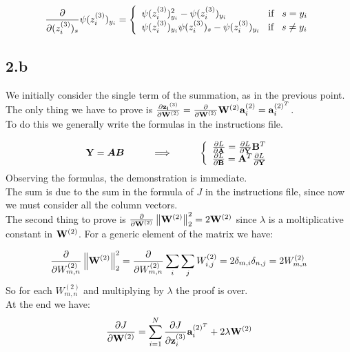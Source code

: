 \documentclass{article}
\DeclareRobustCommand{\vect}[1]{
  \ifcat#1\relax
    \boldsymbol{#1}
  \else
    \mathbf{#1}
  \fi}
\begin{document}
$$
\frac{\partial }{\partial (z_i^{(3)})_s} \psi(z_i^{(3)})_{y_i} = \left\{\begin{array}{l} \psi(z_i^{(3)})_{y_i}^2 - \psi(z_i^{(3)})_{y_i} \hskip 1.53cm \text{if}\hskip 0.3cm  s = y_i\\ \psi(z_i^{(3)})_{y_i}\psi(z_i^{(3)})_{s} - \psi(z_i^{(3)})_{y_i} \hskip 0.3cm \text{if}\hskip 0.3cm  s \neq y_i\end{array}\right.
$$


\subsection*{2.b}
We initially consider the single term of the summation, as in the previous point. The only thing we have to prove is $\frac{\partial \vect{z_i}^{(3)}}{\partial \vect{W}^{(2)}} = \frac{\partial}{\partial \vect{W}^{(2)}}  \vect{W}^{(2)}\vect{a}_i^{(2)} = \vect{a}_i^{(2)^T}$. \\
To do this we generally write the formulas in the instructions file.

$$
\vect{Y} = \vect{AB} \hskip 1cm \Longrightarrow \hskip 1cm \left\{\begin{array}{l} 
\frac{\partial L}{\partial \vect{A}} = \frac{\partial L}{\partial \vect{Y}}\vect{B}^T\\ \frac{\partial L}{\partial \vect{B}} = \vect{A}^T\frac{\partial L}{\partial \vect{Y}}
\end{array}\right.
$$
Observing the formulas, the demonstration is immediate.\\
The sum is due to the sum in the formula of $ J $ in the instructions file, since now we must consider all the column vectors.\\

The second thing to prove is $\frac{\partial }{\partial \vect{W}^{(2)}} \left \| \vect{W}^{(2)} \right \|^2_2 = 2 \vect{W}^{(2)}$ since $\lambda$ is a moltiplicative constant in $\vect{W}^{(2)}$.
For a generic element of the matrix we have: 

$$
\frac{\partial }{\partial W^{(2)}_{m,n}} \left \| \vect{W}^{(2)} \right \|^2_2 = \frac{\partial }{\partial W^{(2)}_{m,n}} \sum_{i}\sum_{j} W^{(2)}_{i,j} = 2\delta_{m,i}\delta_{n,j} = 2 W^{(2)}_{m,n}
$$
So for each $W^{(2)}_{m,n}$ and multiplying by $\lambda$ the proof is over.\\
At the end we have:
$$
\frac{\partial J}{\partial \vect{W}^{(2)}} = \sum_{i=1}^N\frac{\partial J}{\partial\vect{z}_i^{(3)}} \vect{a}_i^{(2)^T}  + 2\lambda \vect{W}^{(2)} 
$$
\end{document}
